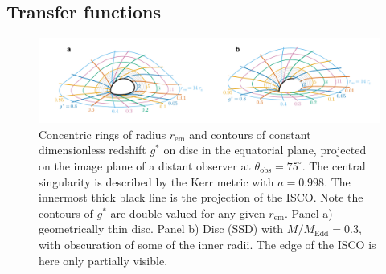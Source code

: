 \documentclass[fleqn,usenatbib]{mnras}
\begin{document}
\subsection{Transfer functions}
\label{sec:transfer-functions}

\begin{figure}
    \centering
    \includegraphics[width=0.95\linewidth]{figures/transfer-function.parameterization.pdf}
    \caption{Concentric rings of radius $r_\text{em}$ and contours of constant
    dimensionless redshift $g^\ast$ on disc in the equatorial plane, projected
on the image plane of a distant observer at $\theta_\text{obs} = 75^\circ$. The
central singularity is described by the Kerr metric with $a = 0.998$. The
innermost thick black line is the projection of the ISCO. Note the contours of
$g^\ast$ are double valued for any given $r_\text{em}$. Panel a) geometrically
thin disc. Panel b) \citet{shakura_black_1973} Disc (SSD) with $\dot{M} / \dot{M}_\text{Edd} = 0.3$, with
obscuration of some of the inner radii. The edge of the ISCO is here only
partially visible.}
    \label{fig:transfer-parameterisation}
\end{figure}
\end{document}
